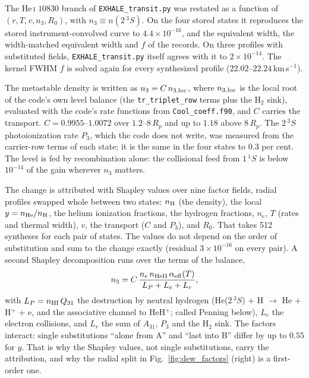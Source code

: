 \documentclass[english,a4paper]{my_memo}
\begin{document}
The He\,\textsc{i} $10830$ branch of \texttt{EXHALE\_transit.py} was restated
as a function of $(r, T, v, n_3, R_0)$, with $n_3 \equiv n(2\,^3S)$. On the
four stored states it reproduces the stored instrument-convolved curve to
$4.4\times10^{-16}$, and the equivalent width, the width-matched equivalent
width and $f$ of the records. On three profiles with substituted fields,
\texttt{EXHALE\_transit.py} itself agrees with it to $2\times10^{-14}$. The
kernel FWHM $f$ is solved again for every synthesized profile
($22.02$--$22.24$\,km\,s$^{-1}$).

The metastable density is written as $n_3 = C\,n_{3,\rm loc}$, where
$n_{3,\rm loc}$ is the local root of the code's own level balance (the
\texttt{tr\_triplet\_row} terms plus the H$_2$ sink), evaluated with the
code's rate functions from \texttt{Cool\_coeff.f90}, and $C$ carries the
transport. $C = 0.9955$--$1.0072$ over $1.2$--$8\,R_p$ and up to $1.18$
above $8\,R_p$. The $2\,^3S$ photoionization rate $P_3$, which the code
does not write, was measured from the carrier-row terms of each state; it is
the same in the four states to $0.3$ per cent. The level is fed by
recombination alone: the collisional feed from $1\,^1S$ is below
$10^{-14}$ of the gain wherever $n_3$ matters.

The change is attributed with Shapley values over nine factor fields,
radial profiles swapped whole between two states: $n_{\rm H}$ (the density),
the local $y = n_{\rm He}/n_{\rm H}$, the helium ionization fractions, the
hydrogen fractions, $n_e$, $T$ (rates and thermal width), $v$, the transport
($C$ and $P_3$), and $R_0$. That takes 512 syntheses for each pair of
states. The values do not depend on the order of substitution and sum to
the change exactly (residual $3\times10^{-16}$ on every pair). A second Shapley
decomposition runs over the terms of the balance,
\begin{equation}
  n_3 = C\,\frac{n_e\,n_{\rm HeII}\,\alpha_{\rm eff}(T)}
               {L_P + L_e + L_r},
  \label{eq:n3balance}
\end{equation}
with $L_P = n_{\rm HI}\,Q_{31}$ the destruction by neutral hydrogen
(He($2\,^3S$) + H $\to$ He + H$^+$ + e, and the associative channel to
HeH$^+$; called Penning below), $L_e$ the electron collisions, and $L_r$
the sum of $A_{31}$, $P_3$ and the H$_2$ sink. The
factors interact: single substitutions ``alone from A'' and ``last into B''
differ by up to $0.55$ for $y$. That is why the Shapley values, not single
substitutions, carry the attribution, and why the radial split in
Fig.~\ref{fig:dew_factors} (right) is a first-order one.
\end{document}
